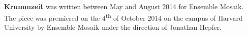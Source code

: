 \textbf{Krummzeit} was written between May and August 2014 for Ensemble Mosaik.
The piece was premiered on the 4\textsuperscript{th} of October 2014 on the
campus of Harvard University by Ensemble Mosaik under the direction of Jonathan
Hepfer.
